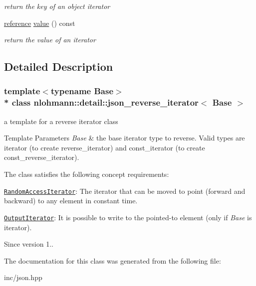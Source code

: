 \begin{DoxyCompactItemize}
\begin{DoxyCompactList}\small\item\em return the key of an object iterator \end{DoxyCompactList}\item 
\hyperlink{classnlohmann_1_1detail_1_1json__reverse__iterator_a42f51a69bac7b2aebb613b2164e457f1}{reference} \hyperlink{classnlohmann_1_1detail_1_1json__reverse__iterator_a4c4e94317f95315f95e9909cf8d65dbf}{value} () const \hypertarget{classnlohmann_1_1detail_1_1json__reverse__iterator_a4c4e94317f95315f95e9909cf8d65dbf}{}\label{classnlohmann_1_1detail_1_1json__reverse__iterator_a4c4e94317f95315f95e9909cf8d65dbf}

\begin{DoxyCompactList}\small\item\em return the value of an iterator \end{DoxyCompactList}\end{DoxyCompactItemize}


\subsection{Detailed Description}
\subsubsection*{template$<$typename Base$>$\\*
class nlohmann\+::detail\+::json\+\_\+reverse\+\_\+iterator$<$ Base $>$}

a template for a reverse iterator class 


\begin{DoxyTemplParams}{Template Parameters}
{\em Base} & the base iterator type to reverse. Valid types are iterator (to create reverse\+\_\+iterator) and const\+\_\+iterator (to create const\+\_\+reverse\+\_\+iterator).\\
\hline
\end{DoxyTemplParams}
The class satisfies the following concept requirements\+:
\begin{DoxyItemize}
\item \href{http://en.cppreference.com/w/cpp/concept/RandomAccessIterator}{\tt Random\+Access\+Iterator}\+: The iterator that can be moved to point (forward and backward) to any element in constant time.
\item \href{http://en.cppreference.com/w/cpp/concept/OutputIterator}{\tt Output\+Iterator}\+: It is possible to write to the pointed-\/to element (only if {\itshape Base} is iterator).
\end{DoxyItemize}

\begin{DoxySince}{Since}
version 1.. 
\end{DoxySince}


The documentation for this class was generated from the following file\+:\begin{DoxyCompactItemize}
\item 
inc/json.\+hpp\end{DoxyCompactItemize}

